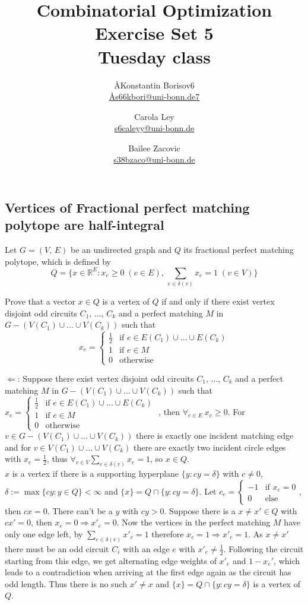 \documentclass{article}
\title{Combinatorial Optimization \\ Exercise Set 5 \\ Tuesday class}
\author{
  \AA{Konstantin Borisov}{6} \\
  \href{mailto:\AA{s66kbori@uni-bonn.de}{7}}{\AA{s66kbori@uni-bonn.de}{7}}
  \and
  Carola Ley \\
  \href{mailto:s6caleyy@uni-bonn.de}{s6caleyy@uni-bonn.de}
  \and
  Bailee Zacovic \\
  \href{mailto:s38bzaco@uni-bonn.de}{s38bzaco@uni-bonn.de}
}
\newcommand{\R}{\mathbb{R}}
\begin{document}
  \maketitle

  \setcounter{section}{5}
  \subsection{Vertices of Fractional perfect matching polytope are half-integral}
  \begin{centerframebox}
    Let $G = (V,\, E)$ be an undirected graph and $Q$ its fractional perfect
    matching polytope, which is defined by
    \[ Q = \{x \in \R^E : x_e \geq 0\; (e \in E),\, \sum_{e \in \delta(v)} x_e = 1\; (v \in V)\} \]

    Prove that a vector $x \in Q$ is a vertex of $Q$ if and only if there exist vertex disjoint
    odd circuits $C_1,\, \dots,\, C_k$ and a perfect matching $M$ in $G - (V(C_1) \cup\dots\cup V(C_k))$
    such that
    \[ x_e = \begin{cases}
      \frac{1}{2} & \textrm{if } e \in E(C_1) \cup\dots\cup E(C_k) \\
      1 & \textrm{if } e \in M \\
      0 & \textrm{otherwise}
    \end{cases} \]
  \end{centerframebox}
  $\Leftarrow$: Suppose there exist vertex disjoint
    odd circuits $C_1,\, \dots,\, C_k$ and a perfect matching $M$ in $G - (V(C_1) \cup\dots\cup V(C_k))$ such that
   $  x_e = \begin{cases}
      \frac{1}{2} & \textrm{if } e \in E(C_1) \cup\dots\cup E(C_k) \\
      1 & \textrm{if } e \in M \\
      0 & \textrm{otherwise}
    \end{cases} $
    , then $\forall_{e\in E}~ x_e\geq 0$. For $v\in G - (V(C_1) \cup\dots\cup V(C_k))$ there is exactly one incident matching edge and for $v\in V(C_1) \cup\dots\cup V(C_k)$ there are exactly two incident circle  edges with $x_e=\frac 12$, thus $\forall_{v\in V} \sum_{e \in \delta(v)} x_e = 1$, so $x\in Q$.\\
    $x$ is a vertex if there is a supporting hyperplane $\{y:cy=\delta\}$ with $c\neq 0$, $\delta:= \max \{cy:y\in Q\}<\infty$ and $\{x\}=Q\cap \{y:cy=\delta\}$. Let $c_e= \begin{cases}-1 & \text{if } x_e=0\\ 0& \text{else} \end{cases} $, then $cx=0$. There can't be a $y$ with $cy>0$. Suppose there is a $x\neq x'\in Q$ with $cx'=0$, then $x_e=0 \Rightarrow x'_e=0$. Now the vertices in the perfect matching $M$ have only one edge left, by $\sum_{e \in \delta(v)} x'_e = 1$ therefore $x_e=1 \Rightarrow x'_e=1$. As $x\neq x'$ there must be an odd circuit $C_i$ with an edge $e$ with $x'_e\neq \frac 12$. Following the circuit starting from this edge, we get alternating edge weights of $x'_e$ and $1-x_e'$, which leads to a contradiction when arriving at the first edge again as the circuit has odd length. Thus there is no such $x'\neq x$ and $\{x\}=Q\cap \{y:cy=\delta\}$ is a vertex of $Q$.\\
\end{document}
